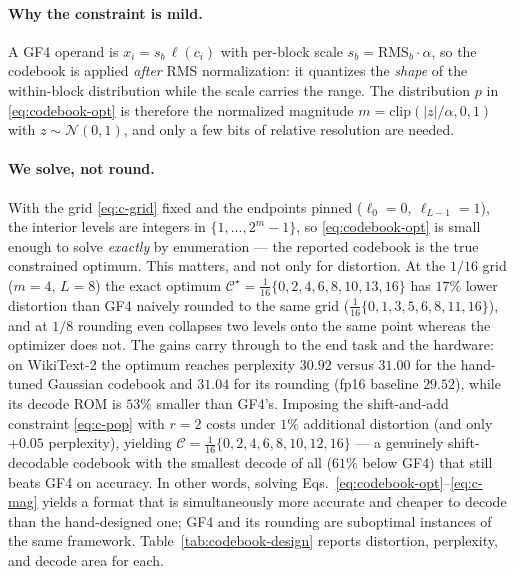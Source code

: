 \paragraph{Why the constraint is mild.} A GF4 operand is $x_i=s_b\,\ell(c_i)$
with per-block scale $s_b=\mathrm{RMS}_b\cdot\alpha$, so the codebook is applied
\emph{after} RMS normalization: it quantizes the \emph{shape} of the within-block
distribution while the scale carries the range. The distribution $p$ in
\eqref{eq:codebook-opt} is therefore the normalized magnitude
$m=\mathrm{clip}(|z|/\alpha,0,1)$ with $z\sim\mathcal{N}(0,1)$, and only a few
bits of relative resolution are needed.

\paragraph{We solve, not round.} With the grid \eqref{eq:c-grid} fixed and the
endpoints pinned ($\ell_0=0,\ \ell_{L-1}=1$), the interior levels are integers in
$\{1,\dots,2^m-1\}$, so \eqref{eq:codebook-opt} is small enough to solve
\emph{exactly} by enumeration --- the reported codebook is the true constrained
optimum. This matters, and not only for distortion. At the $1/16$ grid ($m=4$, $L=8$) the
exact optimum $\mathcal{C}^\star=\tfrac{1}{16}\{0,2,4,6,8,10,13,16\}$ has $17\%$
lower distortion than GF4 naively rounded to the same grid
($\tfrac{1}{16}\{0,1,3,5,6,8,11,16\}$), and at $1/8$ rounding even collapses two
levels onto the same point whereas the optimizer does not. The gains carry
through to the end task and the hardware: on WikiText-2 the optimum reaches
perplexity $30.92$ versus $31.00$ for the hand-tuned Gaussian codebook and
$31.04$ for its rounding (fp16 baseline $29.52$), while its decode ROM is $53\%$
smaller than GF4's. Imposing the shift-and-add constraint \eqref{eq:c-pop} with
$r=2$ costs under $1\%$ additional distortion (and only $+0.05$ perplexity),
yielding $\mathcal{C}=\tfrac{1}{16}\{0,2,4,6,8,10,12,16\}$ --- a genuinely
shift-decodable codebook with the smallest decode of all ($61\%$ below GF4) that
still beats GF4 on accuracy. In other words, solving
Eqs.~\eqref{eq:codebook-opt}--\eqref{eq:c-mag} yields a format that is
simultaneously more accurate and cheaper to decode than the hand-designed one;
GF4 and its rounding are suboptimal instances of the same framework.
Table~\ref{tab:codebook-design} reports distortion, perplexity, and decode area
for each.


